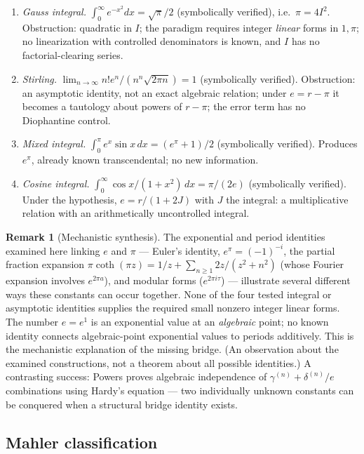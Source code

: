 \documentclass[11pt]{amsart}
\theoremstyle{definition}
\newtheorem{remark}[theorem]{Remark}
\theoremstyle{remark}
\numberwithin{equation}{section}
\newcommand{\ee}{e}
\begin{document}
\begin{enumerate}
\item \emph{Gauss integral.} $\int_0^\infty \ee^{-x^2}dx=\sqrt\pi/2$ (symbolically verified), i.e.\ $\pi=4I^2$. Obstruction: quadratic in $I$; the paradigm requires integer \emph{linear} forms in $1,\pi$; no linearization with controlled denominators is known, and $I$ has no factorial-clearing series.
\item \emph{Stirling.} $\lim_{n\to\infty}n!\ee^n/(n^n\sqrt{2\pi n})=1$ (symbolically verified). Obstruction: an asymptotic identity, not an exact algebraic relation; under $e=r-\pi$ it becomes a tautology about powers of $r-\pi$; the error term has no Diophantine control.
\item \emph{Mixed integral.} $\int_0^\pi \ee^x\sin x\,dx=(\ee^\pi+1)/2$ (symbolically verified). Produces $\ee^\pi$, already known transcendental; no new information.
\item \emph{Cosine integral.} $\int_0^\infty\cos x/(1+x^2)\,dx=\pi/(2\ee)$ (symbolically verified). Under the hypothesis, $\ee=r/(1+2J)$ with $J$ the integral: a multiplicative relation with an arithmetically uncontrolled integral.
\end{enumerate}

\begin{remark}[Mechanistic synthesis]
The exponential and period identities examined here linking $\ee$ and $\pi$ --- Euler's identity, $\ee^\pi=(-1)^{-i}$, the partial fraction expansion $\pi\coth(\pi z)=1/z+\sum_{n\ge1}2z/(z^2+n^2)$ (whose Fourier expansion involves $\ee^{2\pi a}$), and modular forms ($\ee^{2\pi i\tau}$) --- illustrate several different ways these constants can occur together. None of the four tested integral or asymptotic identities supplies the required small nonzero integer linear forms. The number $\ee=\ee^1$ is an exponential value at an \emph{algebraic} point; no known identity connects algebraic-point exponential values to periods additively. This is the mechanistic explanation of the missing bridge. (An observation about the examined constructions, not a theorem about all possible identities.) A contrasting success: Powers \cite{Powers2025} proves algebraic independence of $\gamma^{(n)}+\delta^{(n)}/\ee$ combinations using Hardy's equation --- two individually unknown constants can be conquered when a structural bridge identity exists.
\end{remark}

\subsection{Mahler classification}\label{sub:mahler}
\end{document}
